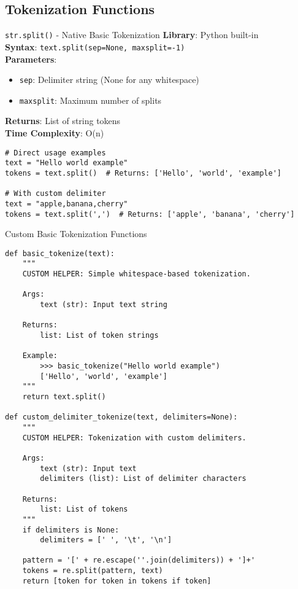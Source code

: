 \documentclass[11pt,a4paper]{article}
\begin{document}
\subsection{Tokenization Functions}

\begin{nativebox}{\texttt{str.split()} - Native Basic Tokenization}
\textbf{Library}: Python built-in \\
\textbf{Syntax}: \texttt{text.split(sep=None, maxsplit=-1)} \\
\textbf{Parameters}:
\begin{itemize}
\item \texttt{sep}: Delimiter string (None for any whitespace)
\item \texttt{maxsplit}: Maximum number of splits
\end{itemize}

\textbf{Returns}: List of string tokens \\
\textbf{Time Complexity}: O(n)

\begin{lstlisting}[caption=Direct string splitting examples]
# Direct usage examples
text = "Hello world example"
tokens = text.split()  # Returns: ['Hello', 'world', 'example']

# With custom delimiter
text = "apple,banana,cherry"
tokens = text.split(',')  # Returns: ['apple', 'banana', 'cherry']
\end{lstlisting}
\end{nativebox}

\begin{custombox}{Custom Basic Tokenization Functions}

\begin{lstlisting}[caption=Custom tokenization helper functions]
def basic_tokenize(text):
    """
    CUSTOM HELPER: Simple whitespace-based tokenization.
    
    Args:
        text (str): Input text string
        
    Returns:
        list: List of token strings
        
    Example:
        >>> basic_tokenize("Hello world example")
        ['Hello', 'world', 'example']
    """
    return text.split()

def custom_delimiter_tokenize(text, delimiters=None):
    """
    CUSTOM HELPER: Tokenization with custom delimiters.
    
    Args:
        text (str): Input text
        delimiters (list): List of delimiter characters
        
    Returns:
        list: List of tokens
    """
    if delimiters is None:
        delimiters = [' ', '\t', '\n']
    
    pattern = '[' + re.escape(''.join(delimiters)) + ']+'
    tokens = re.split(pattern, text)
    return [token for token in tokens if token]
\end{lstlisting}
\end{custombox}
\end{document}
